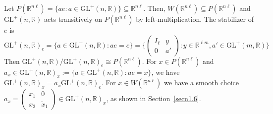 \documentclass[11pt]{article}
\theoremstyle{definition}
\begin{document}
Let $P(\mathbb{R}^{n\ell }) = \{ae : a \in \mathrm{GL}^+(n, \mathbb{R})\} \subseteq \mathbb{R}^{n \ell }$.
Then, $W(\mathbb{R}^{n\ell}) \subseteq P(\mathbb{R}^{n\ell})$ and $\mathrm{GL}^+(n,\mathbb{R})$ acts transitively on $P(\mathbb{R}^{n\ell })$ by left-multiplication.
The stabilizer of $e$ is
\[
    {\mathrm{GL}^+(n, \mathbb{R})}_e = \{a \in \mathrm{GL}^+(n, \mathbb{R}) : ae = e\} = \bigg\{
    \begin{pmatrix}
        I_ \ell  & y  \\
        0        & a'
    \end{pmatrix}
    : y \in \mathbb{R}^{ \ell m}, a' \in \mathrm{GL}^+(m, \mathbb{R})\bigg\}
\]
Then $\mathrm{GL}^+(n, \mathbb{R})/{\mathrm{GL}^+(n, \mathbb{R})}_e \cong P(\mathbb{R}^{n\ell })$.
For $x \in P(\mathbb{R}^{n\ell })$ and $a_x \in {\mathrm{GL}^+(n, \mathbb{R})}_x := \{a \in \mathrm{GL}^+(n, \mathbb{R}) : ae = x\}$, we have ${\mathrm{GL}^+(n, \mathbb{R})}_x = a_x {\mathrm{GL}^+(n, \mathbb{R})}_e$.
For $x \in W(\mathbb{R}^{n\ell })$ we have a smooth choice $a_x =
\begin{pmatrix}
    x_1 & 0	\\
    x_2 & \widetilde{x}_1
\end{pmatrix}
\in {\mathrm{GL}^+(n, \mathbb{R})}_x$, as shown in Section~\ref{secn1.6}.




\end{document}
